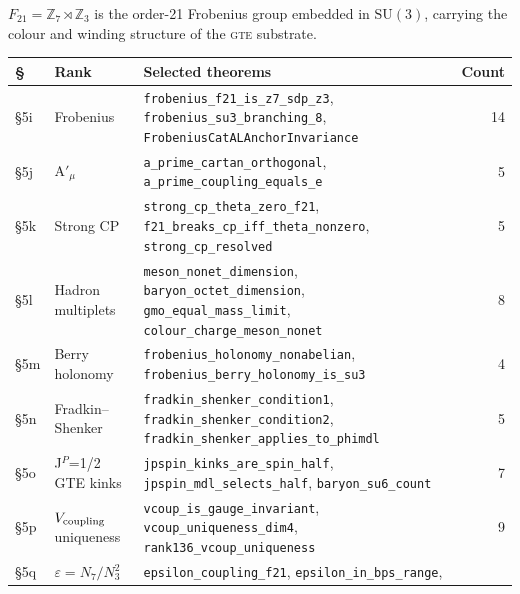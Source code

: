 \documentclass[11pt,a4paper]{article}
\theoremstyle{definition}
\newcommand{\gte}{\textsc{gte}}
\begin{document}
$F_{21} = \mathbb{Z}_7 \rtimes \mathbb{Z}_3$ is the order-21 Frobenius group
embedded in $\mathrm{SU}(3)$, carrying the colour and winding structure of
the \gte{} substrate.

\begin{table}[h]
\centering\small
\begin{tabular}{@{}p{0.7cm}p{2.5cm}p{9.8cm}r@{}}
\toprule
§ & Rank & Selected theorems & Count \\
\midrule
§5i & Frobenius & \texttt{frobenius\_\allowbreak f21\_is\_\allowbreak z7\_sdp\_z3},
  \texttt{frobenius\_\allowbreak su3\_branching\_8},
  \texttt{Frobenius\allowbreak CatAL\allowbreak Anchor\allowbreak Invariance} & 14 \\
§5j & A$'_\mu$ & \texttt{a\_prime\_\allowbreak cartan\_\allowbreak orthogonal},
  \texttt{a\_prime\_\allowbreak coupling\_\allowbreak equals\_e} & 5 \\
§5k & Strong CP & \texttt{strong\_cp\_\allowbreak theta\_zero\_f21},
  \texttt{f21\_breaks\_\allowbreak cp\_iff\_\allowbreak theta\_nonzero},
  \texttt{strong\_cp\_\allowbreak resolved} & 5 \\
§5l & Hadron multiplets & \texttt{meson\_\allowbreak nonet\_\allowbreak dimension},
  \texttt{baryon\_\allowbreak octet\_\allowbreak dimension},
  \texttt{gmo\_equal\_\allowbreak mass\_limit},
  \texttt{colour\_\allowbreak charge\_\allowbreak meson\_nonet} & 8 \\
§5m & Berry holonomy & \texttt{frobenius\_\allowbreak holonomy\_\allowbreak nonabelian},
  \texttt{frobenius\_\allowbreak berry\_\allowbreak holonomy\_is\_su3} & 4 \\
§5n & Fradkin--Shenker & \texttt{fradkin\_\allowbreak shenker\_\allowbreak condition1},
  \texttt{fradkin\_\allowbreak shenker\_\allowbreak condition2},
  \texttt{fradkin\_\allowbreak shenker\_\allowbreak applies\_\allowbreak to\_phimdl} & 5 \\
§5o & J$^P$=1/2 GTE kinks & \texttt{jpspin\_\allowbreak kinks\_\allowbreak are\_spin\_half},
  \texttt{jpspin\_\allowbreak mdl\_\allowbreak selects\_half},
  \texttt{baryon\_\allowbreak su6\_count} & 7 \\
§5p & $V_{\rm coupling}$ uniqueness & \texttt{vcoup\_\allowbreak is\_\allowbreak gauge\_\allowbreak invariant},
  \texttt{vcoup\_\allowbreak uniqueness\_dim4},
  \texttt{rank136\_\allowbreak vcoup\_\allowbreak uniqueness} & 9 \\
§5q & $\varepsilon=N_7/N_3^2$ & \texttt{epsilon\_\allowbreak coupling\_f21},
  \texttt{epsilon\_\allowbreak in\_\allowbreak bps\_range},

\end{tabular}
\end{table}
\end{document}
